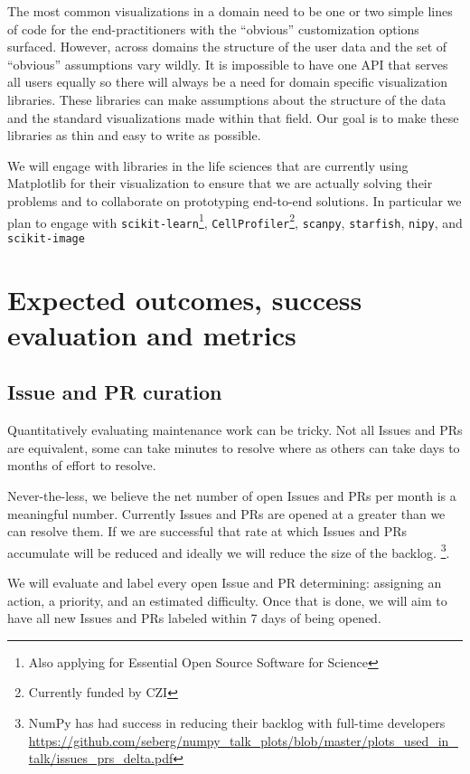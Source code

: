 \documentclass[11pt]{article}  %
\begin{document}
The most common visualizations in a domain need to be one or two
simple lines of code for the end-practitioners with the ``obvious''
customization options surfaced.  However, across domains the structure
of the user data and the set of ``obvious'' assumptions vary wildly.
It is impossible to have one API that serves all users equally so
there will always be a need for domain specific visualization
libraries.  These libraries can make assumptions about the structure
of the data and the standard visualizations made within that field.
Our goal is to make these libraries as thin and easy to write as
possible.

We will engage with libraries in the life sciences that are currently
using Matplotlib for their visualization to ensure that we are
actually solving their problems and to collaborate on prototyping
end-to-end solutions.  In particular we plan to engage with
\texttt{scikit-learn}\footnote{Also applying for Essential Open Source
Software for Science}, \texttt{CellProfiler}\footnote{Currently funded
by CZI\label{f:czi}}, \texttt{scanpy},
\texttt{starfish}, \texttt{nipy}, and
\texttt{scikit-image}




\section{Expected outcomes, success evaluation and metrics}
\subsection{Issue and PR curation}

Quantitatively evaluating maintenance work can be tricky.  Not all
Issues and PRs are equivalent, some can take minutes to resolve where
as others can take days to months of effort to resolve.

Never-the-less, we believe the net number of open Issues and PRs per
month is a meaningful number.  Currently Issues and PRs are opened at
a greater than we can resolve them.  If we are successful that rate
at which Issues and PRs accumulate will be reduced and ideally we will
reduce the size of the backlog.
\footnote{NumPy has had success in reducing their backlog with full-time
developers \url{https://github.com/seberg/numpy\_talk\_plots/blob/master/plots\_used\_in\_talk/issues\_prs\_delta.pdf}}.


We will evaluate and label every open Issue and PR
determining: assigning an action, a priority, and an estimated
difficulty.  Once that is done, we will aim to have all new Issues and
PRs labeled within 7 days of being opened.
\end{document}
